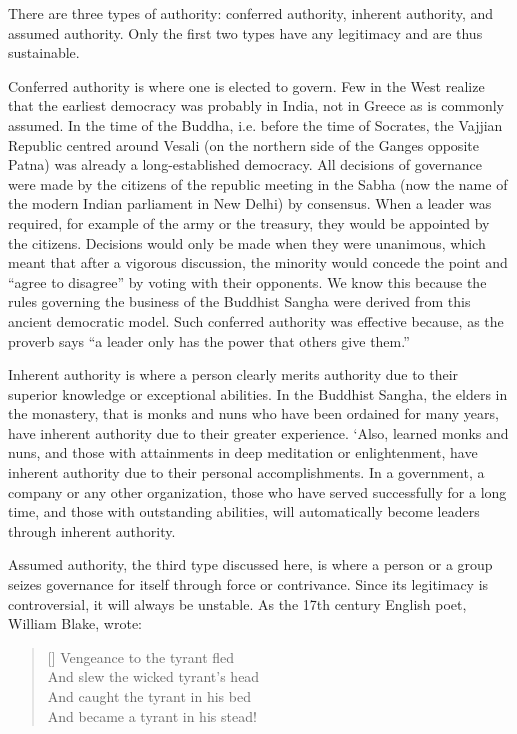 \documentclass[11pt, openany]{book}
\begin{document}
There are three types of authority: conferred authority, inherent authority, and assumed authority. Only the first two types have any legitimacy and are thus sustainable.

Conferred authority is where one is elected to govern. Few in the West realize that the earliest democracy was probably in India, not in Greece as is commonly assumed. In the time of the Buddha, i.e. before the time of Socrates, the Vajjian Republic centred around Vesali (on the northern side of the Ganges opposite Patna) was already a long-established democracy. All decisions of governance were made by the citizens of the republic meeting in the Sabha (now the name of the modern Indian parliament in New Delhi) by consensus. When a leader was required, for example of the army or the treasury, they would be appointed by the citizens. Decisions would only be made when they were unanimous, which meant that after a vigorous discussion, the minority would concede the point and “agree to disagree” by voting with their opponents. We know this because the rules governing the business of the Buddhist Sangha were derived from this ancient democratic model. Such conferred authority was effective because, as the proverb says “a leader only has the power that others give them.”

Inherent authority is where a person clearly merits authority due to their superior knowledge or exceptional abilities. In the Buddhist Sangha, the elders in the monastery, that is monks and nuns who have been ordained for many years, have inherent authority due to their greater experience. ‘Also, learned monks and nuns, and those with attainments in deep meditation or enlightenment, have inherent authority due to their personal accomplishments. In a government, a company or any other organization, those who have served successfully for a long time, and those with outstanding abilities, will automatically become leaders through inherent authority.

Assumed authority, the third type discussed here, is where a person or a group seizes governance for itself through force or contrivance. Since its legitimacy is controversial, it will always be unstable. As the 17th century English poet, William Blake, wrote:

\begin{verse} [\versewidth]
Vengeance to the tyrant fled\\
And slew the wicked tyrant’s head\\
And caught the tyrant in his bed\\
And became a tyrant in his stead!
\end{verse}
\end{document}

